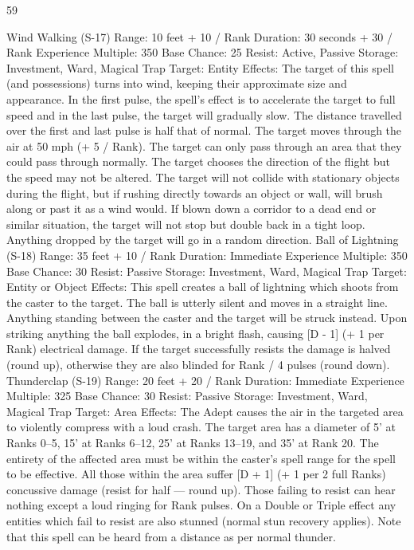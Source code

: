 \documentclass[a4paper]{article}
\begin{document}
\begin{multicols}{3}
59

Wind Walking (S-17)
Range: 10 feet + 10 / Rank
Duration: 30 seconds + 30 / Rank
Experience Multiple: 350
Base Chance: 25%
Resist: Active, Passive
Storage: Investment, Ward, Magical Trap
Target: Entity
Effects: The target of this spell (and possessions)
turns into wind, keeping their approximate size and
appearance. In the first pulse, the spell’s effect is to
accelerate the target to full speed and in the last
pulse, the target will gradually slow. The distance
travelled over the first and last pulse is half that of
normal. The target moves through the air at 50 mph
(+ 5 / Rank). The target can only pass through an
area that they could pass through normally. The
target chooses the direction of the flight but the
speed may not be altered. The target will not collide with stationary objects during the flight, but if
rushing directly towards an object or wall, will
brush along or past it as a wind would. If blown
down a corridor to a dead end or similar situation,
the target will not stop but double back in a tight
loop. Anything dropped by the target will go in a
random direction.
Ball of Lightning (S-18)
Range: 35 feet + 10 / Rank
Duration: Immediate
Experience Multiple: 350
Base Chance: 30%
Resist: Passive
Storage: Investment, Ward, Magical Trap
Target: Entity or Object
Effects: This spell creates a ball of lightning which
shoots from the caster to the target. The ball is
utterly silent and moves in a straight line. Anything
standing between the caster and the target will be
struck instead. Upon striking anything the ball
explodes, in a bright flash, causing [D - 1] (+ 1 per
Rank) electrical damage. If the target successfully
resists the damage is halved (round up), otherwise
they are also blinded for Rank / 4 pulses (round
down).
Thunderclap (S-19)
Range: 20 feet + 20 / Rank
Duration: Immediate
Experience Multiple: 325
Base Chance: 30%
Resist: Passive
Storage: Investment, Ward, Magical Trap
Target: Area
Effects: The Adept causes the air in the targeted
area to violently compress with a loud crash. The
target area has a diameter of 5’ at Ranks 0–5, 15’ at
Ranks 6–12, 25’ at Ranks 13–19, and 35’ at Rank
20. The entirety of the affected area must be within
the caster’s spell range for the spell to be effective.
All those within the area suffer [D + 1] (+ 1 per 2
full Ranks) concussive damage (resist for half —
round up). Those failing to resist can hear nothing
except a loud ringing for Rank pulses. On a Double
or Triple effect any entities which fail to resist are
also stunned (normal stun recovery applies). Note
that this spell can be heard from a distance as per
normal thunder.


\end{multicols}
\end{document}

